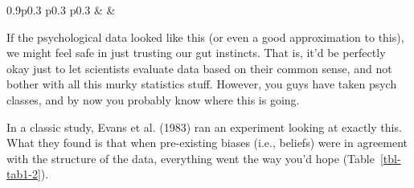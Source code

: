 \documentclass[
  a4paper,
]{book}
\begin{document}
\begin{table}[ht]
\begin{centerbox}
\begin{threeparttable}
\begin{tabularx}{0.9\textwidth}{p{} p{} p{}}
 &
 &
 \tabularnewline[-0.5pt]


\end{tabularx} 

\end{threeparttable}\par\end{centerbox}

\end{table}
 

If the psychological data looked like this (or even a good approximation
to this), we might feel safe in just trusting our gut instincts. That
is, it'd be perfectly okay just to let scientists evaluate data based on
their common sense, and not bother with all this murky statistics stuff.
However, you guys have taken psych classes, and by now you probably know
where this is going.

In a classic study, Evans et al. (1983) ran an experiment looking at
exactly this. What they found is that when pre-existing biases (i.e.,
beliefs) were in agreement with the structure of the data, everything
went the way you'd hope (Table~\ref{tbl-tab1-2}).

\hypertarget{tbl-tab1-2}{}
 
  \providecommand{\huxb}[2]{\arrayrulecolor[RGB]{#1}\global\arrayrulewidth=#2pt}
  \providecommand{\huxvb}[2]{\color[RGB]{#1}\vrule width #2pt}
  \providecommand{\huxtpad}[1]{\rule{0pt}{#1}}
  \providecommand{\huxbpad}[1]{\rule[-#1]{0pt}{#1}}
\end{document}
